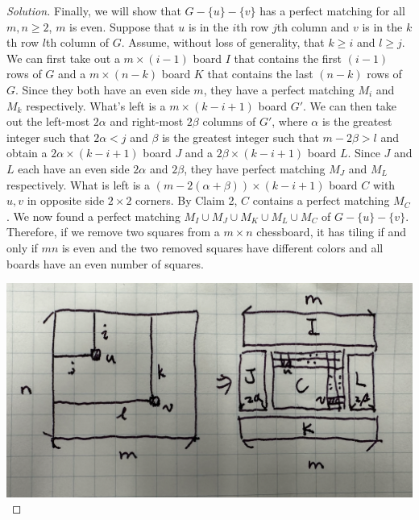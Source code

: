 \documentclass{article}
\begin{document}
\begin{enumerate}[label=(\alph*)]
\begin{proof}[Solution]
        Finally, we will show that $G - \{u\} - \{v\}$ has a perfect matching for all $m, n \geq 2$, $m$ is even. Suppose that $u$ is in the $i$th row $j$th column and $v$ is in the $k$th row $l$th column of $G$. Assume, without loss of generality, that $k \geq i$ and $l \geq j$. We can first take out a $m \times (i - 1)$ board $I$ that contains the first $(i - 1)$ rows of $G$ and a $m \times (n - k)$ board $K$ that contains the last $(n - k)$ rows of $G$. Since they both have an even side $m$, they have a perfect matching $M_i$ and $M_k$ respectively. What's left is a $m \times (k - i + 1)$ board $G'$. We can then take out the left-most $2\alpha$ and right-most $2\beta$ columns of $G'$, where $\alpha$ is the greatest integer such that $2\alpha < j$ and $\beta$ is the greatest integer such that $m - 2\beta > l$ and obtain a $2\alpha \times (k - i + 1)$ board $J$ and a $2\beta \times (k - i + 1)$ board $L$. Since $J$ and $L$ each have an even side $2\alpha$ and $2\beta$, they have perfect matching $M_J$ and $M_L$ respectively. What is left is a $(m - 2(\alpha + \beta)) \times (k - i + 1)$ board $C$ with $u, v$ in opposite side $2 \times 2$ corners. By Claim 2, $C$ contains a perfect matching $M_C$. We now found a perfect matching $M_I \cup M_J \cup M_K \cup M_L \cup M_C$ of $G - \{u\} - \{v\}$. Therefore, if we remove two squares from a $m \times n$ chessboard, it has tiling if and only if $mn$ is even and the two removed squares have different colors and all boards have an even number of squares.
        
        \includegraphics[width=\textwidth]{Q382b3}
    \end{proof}
\end{enumerate}

\newpage
\end{document}
